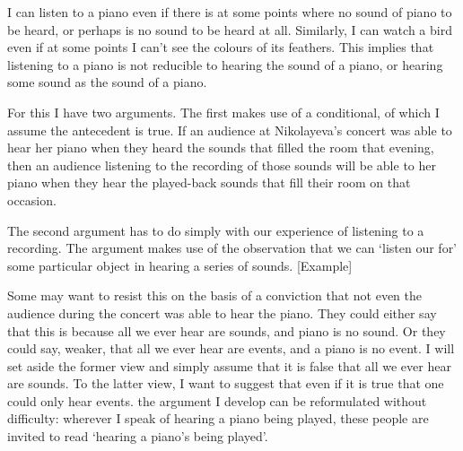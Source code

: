 \documentclass[sloppy, journal, git, bytitle, dodraft]{humapap}
\begin{document}
I can listen to a piano even if there is at some points where no sound of piano to be heard, or perhaps is no sound to be heard at all. Similarly, I can watch a bird even if at some points I can't see the colours of its feathers. This implies that listening to a piano is not reducible to hearing the sound of a piano, or hearing some sound as the sound of a piano. 



For this I have two arguments. The first makes use of a conditional, of which I assume the antecedent is true. If an audience at Nikolayeva's concert was able to hear her piano when they heard the sounds that filled the room that evening, then an audience listening to the recording of those sounds will be able to her piano when they hear the played-back sounds that fill their room on that occasion. %



The second argument has to do simply with our experience of listening to a recording. The argument makes use of the observation that we can `listen our for' some particular object in hearing a series of sounds. [Example]





 
 
Some may want to resist this on the basis of a conviction that not even the audience during the concert was able to hear the piano. They could either say that this is because all we ever hear are sounds, and piano is no sound. Or they could say, weaker, that all we ever hear are events, and a piano is no event. I will set aside the former view and simply assume that it is false that all we ever hear are sounds. To the latter view, I want to suggest that even if it is true that one could only hear events. the argument I develop can be reformulated without difficulty: wherever I speak of hearing a piano being played, these people are invited to read `hearing a piano's being played'.
\end{document}
